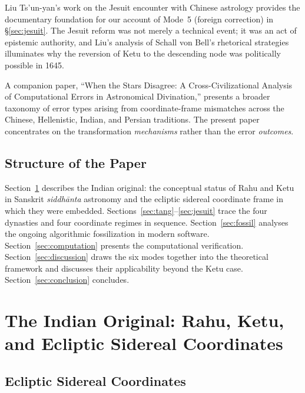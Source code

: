 \documentclass[10pt,a4paper]{article}
\begin{document}
Liu Ts'un-yan's work on the Jesuit encounter with Chinese astrology
\cite{liu2020missionary} provides the documentary foundation for our account of
Mode~5 (foreign correction) in \S\ref{sec:jesuit}.  The Jesuit reform was not
merely a technical event; it was an act of epistemic authority, and Liu's analysis
of Schall von Bell's rhetorical strategies illuminates why the reversion of Ketu
to the descending node was politically possible in 1645.

A companion paper, ``When the Stars Disagree: A Cross-Civilizational Analysis
of Computational Errors in Astronomical Divination,'' presents a broader taxonomy
of error types arising from coordinate-frame mismatches across the Chinese,
Hellenistic, Indian, and Persian traditions.  The present paper concentrates on
the transformation \emph{mechanisms} rather than the error \emph{outcomes}.

\subsection*{Structure of the Paper}

Section~\ref{sec:indian} describes the Indian original: the conceptual status of
Rahu and Ketu in Sanskrit \textit{siddh\=anta} astronomy and the ecliptic sidereal
coordinate frame in which they were embedded.  Sections~\ref{sec:tang}--\ref{sec:jesuit}
trace the four dynasties and four coordinate regimes in sequence.
Section~\ref{sec:fossil} analyses the ongoing algorithmic fossilization in modern
software.  Section~\ref{sec:computation} presents the computational verification.
Section~\ref{sec:discussion} draws the six modes together into the theoretical
framework and discusses their applicability beyond the Ketu case.
Section~\ref{sec:conclusion} concludes.

\section{The Indian Original: Rahu, Ketu, and Ecliptic Sidereal Coordinates}
\label{sec:indian}

\subsection*{Ecliptic Sidereal Coordinates}
\end{document}
